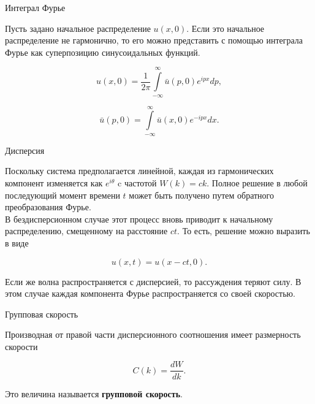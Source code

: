 \documentclass[10pt,xcolor=pst,aspectratio=169]{beamer}
\begin{document}
\begin{frame}{Интеграл Фурье}

    \transdissolve[duration=0.1]
    \justifying
    \large

    Пусть задано начальное распределение $u \left( x, 0 \right)$. Если это начальное распределение не гармонично, то его можно представить с помощью интеграла Фурье как суперпозицию синусоидальных функций.

    \[
        u \left( x, 0 \right) = \frac{1}{2 \pi} \int\limits_{-\infty}^{\infty} \bar{u} \left( p, 0 \right) e^{i p x} dp ,
    \]

    \[
        \bar{u} \left( p, 0 \right) = \int\limits_{-\infty}^{\infty} \bar{u} \left( x, 0 \right) e^{- i p x} dx .
    \]

\end{frame}

\begin{frame}{Дисперсия}

    \transdissolve[duration=0.1]
    \justifying
    \large

    Поскольку система предполагается линейной, каждая из гармонических компонент изменяется как $e^{i \theta}$ c частотой $W \left( k \right) = c k$. Полное решение в любой последующий момент времени $t$ может быть получено путем обратного преобразования Фурье.\\

    В бездисперсионном случае этот процесс вновь приводит к начальному распределению, смещенному на расстояние $c t$. То есть, решение можно выразить в виде

    \[
        u \left( x, t \right) = u \left( x - c t, 0 \right).
    \]

Если же волна распространяется с дисперсией, то рассуждения теряют силу. В этом случае каждая компонента Фурье распространяется со своей скоростью.

\end{frame}

\begin{frame}{Групповая скорость}

    \transdissolve[duration=0.1]
    \justifying
    \large

    Производная от правой части дисперсионного соотношения имеет размерность скорости

    \[
        C \left( k \right) = \frac{d W}{d k}.
    \]

    Это величина называется \textbf{групповой скорость}.

\end{frame}
\end{document}
